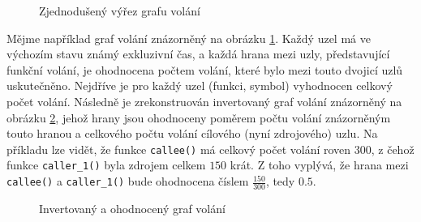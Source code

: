 \documentclass[czech,BP]{thesiskiv}
\begin{document}
\begin{figure}[htp] 
\caption{Zjednodušený výřez grafu volání}\label{obr:callgraph_ex}
\end{figure}

Mějme například graf volání znázorněný na obrázku \ref{obr:callgraph_ex}. Každý uzel má ve výchozím stavu známý exkluzivní čas, a každá hrana mezi uzly, představující funkční volání, je ohodnocena počtem volání, které bylo mezi touto dvojicí uzlů uskutečněno. Nejdříve je pro každý uzel (funkci, symbol) vyhodnocen celkový počet volání. Následně je zrekonstruován invertovaný graf volání znázorněný na obrázku \ref{obr:callgraph_ex_rev}, jehož hrany jsou ohodnoceny poměrem počtu volání znázorněným touto hranou a celkového počtu volání cílového (nyní zdrojového) uzlu. Na příkladu lze vidět, že funkce \texttt{callee()} má celkový počet volání roven $300$, z čehož funkce \texttt{caller\_1()} byla zdrojem celkem $150$ krát. Z toho vyplývá, že hrana mezi \texttt{callee()} a \texttt{caller\_1()} bude ohodnocena číslem $\frac{150}{300}$, tedy $0.5$.

\begin{figure}[htp] 
\caption{Invertovaný a ohodnocený graf volání}\label{obr:callgraph_ex_rev}
\end{figure}
\end{document}
